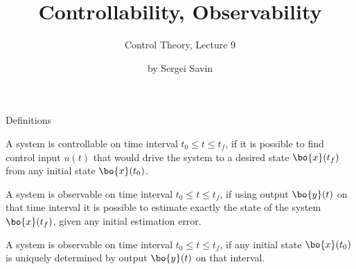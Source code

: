 \documentclass{beamer}
\title{Controllability, Observability}
\subtitle{Control Theory, Lecture 9}
\author{by Sergei Savin}
\date{\mydate}
\begin{document}
\maketitle









\begin{frame}{Definitions}
	\begin{flushleft}
		
		\begin{definition}[Controllability]
			A system is controllable on time interval $t_0 \leq t \leq t_f$, if it is possible to find control input $u(t)$ that would drive the system to a desired state $\bo{x}(t_f)$ from any initial state $\bo{x}(t_0)$.
		\end{definition}
		
		\begin{definition}[Observability]
			A system is observable on time interval $t_0 \leq t \leq t_f$, if using output $\bo{y}(t)$ on that time interval it is possible to estimate exactly the state of the system $\bo{x}(t_f)$, given any initial estimation error.
		\end{definition}
	
		\begin{definition}
				A system is observable on time interval $t_0 \leq t \leq t_f$, if any initial state $\bo{x}(t_0)$ is uniquely determined by output $\bo{y}(t)$ on that interval.
		\end{definition}
		
	\end{flushleft}
\end{frame}
\end{document}

